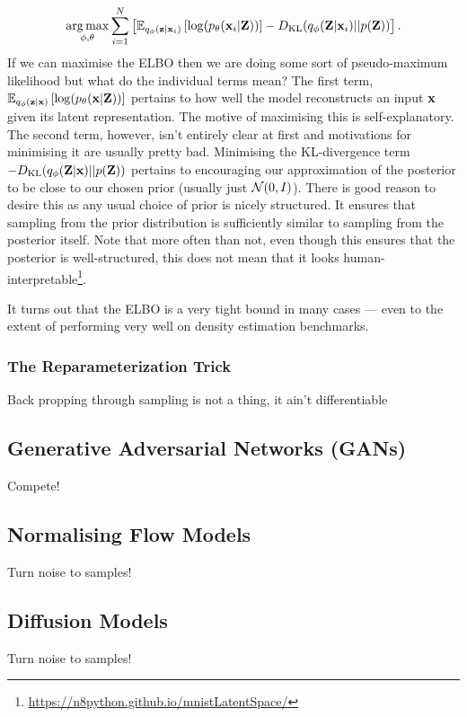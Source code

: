 \documentclass[11pt]{article}
\begin{document}
$$
\operatorname*{arg\,max}_{\phi,\theta}\sum_{i=1}^N\left[\mathbb{E}_{q_{\phi}(\mathbf{z}|\mathbf{x}_i)}\left[\log(p_{\theta}(\mathbf{x}_i|\mathbf{Z}))\right]-D_{\text{KL}}(q_{\phi}(\mathbf{Z}|\mathbf{x}_i)||p(\mathbf{Z}))\right].
$$
If we can maximise the ELBO then we are doing some sort of pseudo-maximum likelihood but what do the individual terms mean? The first term, $\mathbb{E}_{q_{\phi}(\mathbf{z}|\mathbf{x})}\left[\log(p_{\theta}(\mathbf{x}|\mathbf{Z}))\right]$ pertains to how well the model reconstructs an input $\mathbf{x}$ given its latent representation. The motive of maximising this is self-explanatory. The second term, however, isn't entirely clear at first and motivations for minimising it are usually pretty bad. Minimising the KL-divergence term $-D_{\text{KL}}(q_{\phi}(\mathbf{Z}|\mathbf{x})||p(\mathbf{Z}))$ pertains to encouraging our approximation of the posterior to be close to our chosen prior (usually just $\mathcal{N}(0,I)$). There is good reason to desire this as any usual choice of prior is nicely structured. It ensures that sampling from the prior distribution is sufficiently similar to sampling from the posterior itself. Note that more often than not, even though this ensures that the posterior is well-structured, this does not mean that it looks human-interpretable\footnote{\url{https://n8python.github.io/mnistLatentSpace/}}.

It turns out that the ELBO is a very tight bound in many cases — even to the extent of performing very well on density estimation benchmarks.

\subsubsection{The Reparameterization Trick}
Back propping through sampling is not a thing, it ain't differentiable 

\subsection{Generative Adversarial Networks (GANs)}
Compete!

\subsection{Normalising Flow Models}
Turn noise to samples!

\subsection{Diffusion Models}
Turn noise to samples!
\end{document}
